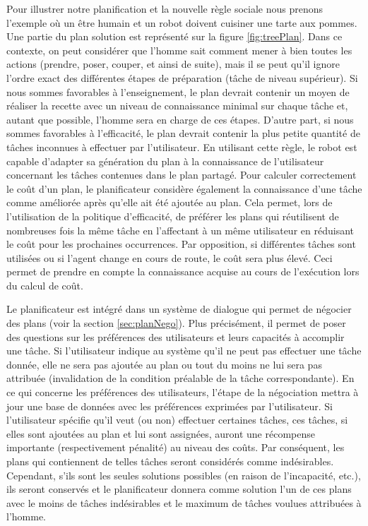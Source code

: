 \documentclass[a4paper,11pt,twoside]{StyleThese}
\begin{document}
Pour illustrer notre planification et la nouvelle règle sociale nous prenons l'exemple où un être humain et un robot doivent cuisiner une tarte aux pommes. Une partie du plan solution est représenté sur la figure \ref{fig:treePlan}. Dans ce contexte, on peut considérer que l'homme sait comment mener à bien toutes les actions (prendre, poser, couper, et ainsi de suite), mais il se peut qu'il ignore  l'ordre exact des différentes étapes de préparation (tâche de niveau supérieur). Si nous sommes favorables à l'enseignement, le plan devrait contenir un moyen de réaliser la recette avec un niveau de connaissance minimal sur chaque tâche et, autant que possible, l'homme sera en charge de ces étapes. D'autre part, si nous sommes favorables à l'efficacité, le plan devrait contenir la plus petite quantité de tâches inconnues à effectuer par l'utilisateur.
En utilisant cette règle, le robot est capable d'adapter sa génération du plan à la connaissance de l'utilisateur concernant les tâches contenues dans le plan partagé.
Pour calculer correctement le coût d'un plan, le planificateur considère également la connaissance d'une tâche comme améliorée après qu'elle ait été ajoutée au plan. Cela permet, lors de l'utilisation de la politique d'efficacité, de préférer les plans qui réutilisent de nombreuses fois la même tâche en l'affectant à un même utilisateur en réduisant le coût pour les prochaines occurrences. Par opposition, si différentes tâches sont utilisées ou si l'agent change en cours de route, le coût sera plus élevé. Ceci permet de prendre en compte la connaissance acquise au cours de l'exécution lors du calcul de coût.

Le planificateur est intégré dans un système de dialogue qui permet de négocier des plans (voir la section \ref{sec:planNego}). Plus précisément, il permet de poser des questions sur les préférences des utilisateurs et leurs capacités à accomplir une tâche. Si l'utilisateur indique au système qu'il ne peut pas effectuer une tâche donnée, elle ne sera pas ajoutée au plan ou tout du moins ne lui sera pas attribuée (invalidation de la condition préalable de la tâche correspondante).
En ce qui concerne les préférences des utilisateurs, l'étape de la négociation mettra à jour une base de données avec les préférences exprimées par l'utilisateur. Si l'utilisateur spécifie qu'il veut (ou non) effectuer certaines tâches, ces tâches, si elles sont ajoutées au plan et lui sont assignées, auront une récompense importante (respectivement pénalité) au niveau des coûts. Par conséquent, les plans qui contiennent de telles tâches seront considérés comme indésirables. Cependant, s'ils sont les seules solutions possibles (en raison de l'incapacité, etc.), ils seront conservés et le planificateur donnera comme solution l'un de ces plans avec le moins de tâches indésirables et le maximum de tâches voulues attribuées à l'homme.
\end{document}
